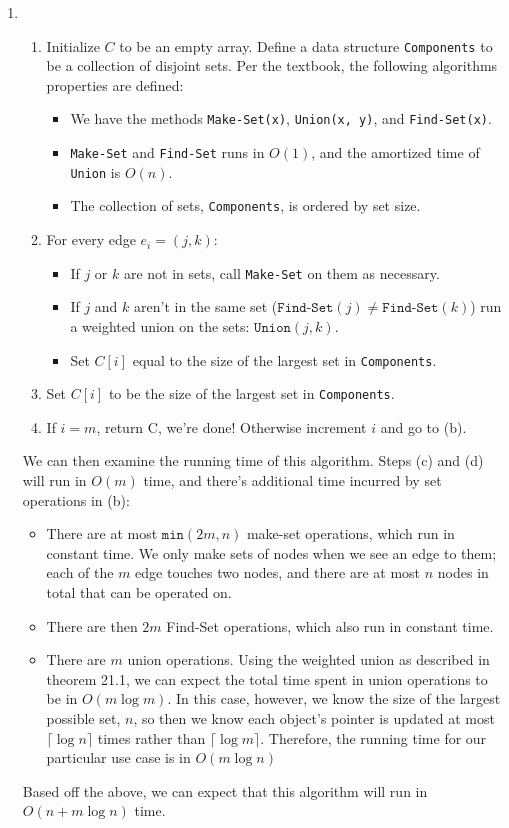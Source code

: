 \documentclass{article}
\begin{document}
\begin{enumerate}
\item
    \begin{enumerate}
    \item Initialize $C$ to be an empty array. Define a data structure \texttt{Components} to be a collection of disjoint sets. Per the textbook, the following algorithms properties are defined:
        \begin{itemize}
        \item We have the methods \texttt{Make-Set(x)}, \texttt{Union(x, y)}, and \texttt{Find-Set(x)}.
        \item \texttt{Make-Set} and \texttt{Find-Set} runs in $O(1)$, and the amortized time of \texttt{Union} is $O(n)$.
        \item The collection of sets, \texttt{Components}, is ordered by set size.
        \end{itemize}
    \item For every edge $e_i = (j, k)$:
        \begin{itemize}
        \item If $j$ or $k$ are not in sets, call \texttt{Make-Set} on them as necessary.
        \item If $j$ and $k$ aren't in the same set ($\texttt{Find-Set}(j) \neq \texttt{Find-Set}(k)$) run a weighted union on the sets: $\texttt{Union}(j, k)$.
        \item Set $C[i]$ equal to the size of the largest set in \texttt{Components}.
        \end{itemize}
    \item Set $C[i]$ to be the size of the largest set in \texttt{Components}.
    \item If $i = m$, return C, we're done! Otherwise increment $i$ and go to (b).
    \end{enumerate}

    We can then examine the running time of this algorithm. Steps (c) and (d) will run in $O(m)$ time, and there's additional time incurred by set operations in (b):
        \begin{itemize}
        \item There are at most $\texttt{min}(2m, n)$ make-set operations, which run in constant time. We only make sets of nodes when we see an edge to them; each of the $m$ edge touches two nodes, and there are at most $n$ nodes in total that can be operated on.
        \item There are then $2m$ Find-Set operations, which also run in constant time.
        \item There are $m$ union operations. Using the weighted union as described in theorem 21.1, we can expect the total time spent in union operations to be in $O(m \log m)$. In this case, however, we know the size of the largest possible set, $n$, so then we know each object's pointer is updated at most $\lceil \log n \rceil$ times rather than $\lceil \log m \rceil$. Therefore, the running time for our particular use case is in $O(m \log n)$
        \end{itemize}

    Based off the above, we can expect that this algorithm will run in $O(n + m \log n)$ time.
\end{enumerate}
\end{document}
